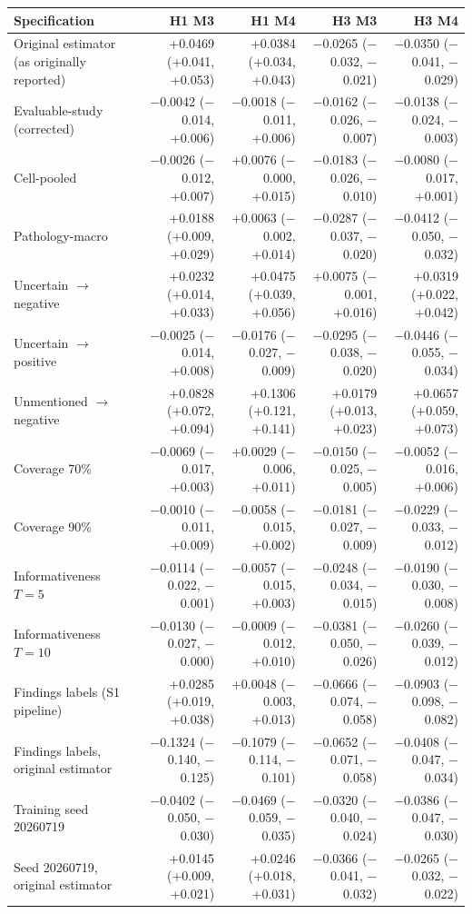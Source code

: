 \begin{tabular}{lrrrr}
\toprule
Specification & H1 M3 & H1 M4 & H3 M3 & H3 M4\\
\midrule
Original estimator (as originally reported) & +0.0469 (+0.041, +0.053) & +0.0384 (+0.034, +0.043) & $-$0.0265 ($-$0.032, $-$0.021) & $-$0.0350 ($-$0.041, $-$0.029)\\
Evaluable-study (corrected) & $-$0.0042 ($-$0.014, +0.006) & $-$0.0018 ($-$0.011, +0.006) & $-$0.0162 ($-$0.026, $-$0.007) & $-$0.0138 ($-$0.024, $-$0.003)\\
Cell-pooled & $-$0.0026 ($-$0.012, +0.007) & +0.0076 ($-$0.000, +0.015) & $-$0.0183 ($-$0.026, $-$0.010) & $-$0.0080 ($-$0.017, +0.001)\\
Pathology-macro & +0.0188 (+0.009, +0.029) & +0.0063 ($-$0.002, +0.014) & $-$0.0287 ($-$0.037, $-$0.020) & $-$0.0412 ($-$0.050, $-$0.032)\\
Uncertain $\to$ negative & +0.0232 (+0.014, +0.033) & +0.0475 (+0.039, +0.056) & +0.0075 ($-$0.001, +0.016) & +0.0319 (+0.022, +0.042)\\
Uncertain $\to$ positive & $-$0.0025 ($-$0.014, +0.008) & $-$0.0176 ($-$0.027, $-$0.009) & $-$0.0295 ($-$0.038, $-$0.020) & $-$0.0446 ($-$0.055, $-$0.034)\\
Unmentioned $\to$ negative & +0.0828 (+0.072, +0.094) & +0.1306 (+0.121, +0.141) & +0.0179 (+0.013, +0.023) & +0.0657 (+0.059, +0.073)\\
Coverage 70\% & $-$0.0069 ($-$0.017, +0.003) & +0.0029 ($-$0.006, +0.011) & $-$0.0150 ($-$0.025, $-$0.005) & $-$0.0052 ($-$0.016, +0.006)\\
Coverage 90\% & $-$0.0010 ($-$0.011, +0.009) & $-$0.0058 ($-$0.015, +0.002) & $-$0.0181 ($-$0.027, $-$0.009) & $-$0.0229 ($-$0.033, $-$0.012)\\
Informativeness $T=5$ & $-$0.0114 ($-$0.022, $-$0.001) & $-$0.0057 ($-$0.015, +0.003) & $-$0.0248 ($-$0.034, $-$0.015) & $-$0.0190 ($-$0.030, $-$0.008)\\
Informativeness $T=10$ & $-$0.0130 ($-$0.027, $-$0.000) & $-$0.0009 ($-$0.012, +0.010) & $-$0.0381 ($-$0.050, $-$0.026) & $-$0.0260 ($-$0.039, $-$0.012)\\
Findings labels (S1 pipeline) & +0.0285 (+0.019, +0.038) & +0.0048 ($-$0.003, +0.013) & $-$0.0666 ($-$0.074, $-$0.058) & $-$0.0903 ($-$0.098, $-$0.082)\\
Findings labels, original estimator & $-$0.1324 ($-$0.140, $-$0.125) & $-$0.1079 ($-$0.114, $-$0.101) & $-$0.0652 ($-$0.071, $-$0.058) & $-$0.0408 ($-$0.047, $-$0.034)\\
Training seed 20260719 & $-$0.0402 ($-$0.050, $-$0.030) & $-$0.0469 ($-$0.059, $-$0.035) & $-$0.0320 ($-$0.040, $-$0.024) & $-$0.0386 ($-$0.047, $-$0.030)\\
Seed 20260719, original estimator & +0.0145 (+0.009, +0.021) & +0.0246 (+0.018, +0.031) & $-$0.0366 ($-$0.041, $-$0.032) & $-$0.0265 ($-$0.032, $-$0.022)\\
\bottomrule
\end{tabular}
